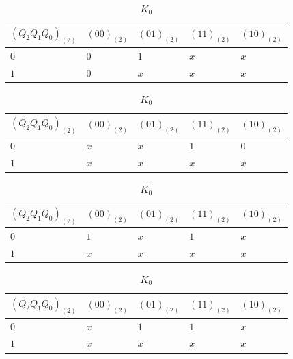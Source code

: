 \documentclass{ctexrep}
\begin{document}
\begin{enumerate}
\begin{table}[htbp]
			\vspace{2em}
			\begin{subtable}[htbp]{.45\linewidth}
				\centering
				\caption{$ J_1 $}
				\label{tab:J1}
				\begin{tabu}to
					$(Q_2Q_1Q_0)_{(2)}$& $(00)_{(2)}$ & $(01)_{(2)}$ & $(11)_{(2)}$ & $(10)_{(2)}$ \\
					\hline
					$0$ & $0$ & $1$ & $x$ & $x$ \\
					$1$ & $0$ & $x$ & $x$ & $x$ \\
				\end{tabu}
			\end{subtable}
			\quad
			\begin{subtable}[htbp]{.45\linewidth}
				\centering
				\caption{$ K_1 $}
				\label{tab:K1}
				\begin{tabu}to
					$(Q_2Q_1Q_0)_{(2)}$& $(00)_{(2)}$ & $(01)_{(2)}$ & $(11)_{(2)}$ & $(10)_{(2)}$ \\
					\hline
					$0$ & $x$ & $x$ & $1$ & $0$ \\
					$1$ & $x$ & $x$ & $x$ & $x$ \\
				\end{tabu}
			\end{subtable}

			\vspace{2em}
			\begin{subtable}[htbp]{.45\linewidth}
				\centering
				\caption{$ J_0 $}
				\label{tab:J0}
				\begin{tabu}to
					$(Q_2Q_1Q_0)_{(2)}$& $(00)_{(2)}$ & $(01)_{(2)}$ & $(11)_{(2)}$ & $(10)_{(2)}$ \\
					\hline
					$0$ & $1$ & $x$ & $1$ & $x$ \\
					$1$ & $x$ & $x$ & $x$ & $x$ \\
				\end{tabu}
			\end{subtable}
			\quad
			\begin{subtable}[htbp]{.45\linewidth}
				\centering
				\caption{$ K_0 $}
				\label{tab:K0}
				\begin{tabu}to
					$(Q_2Q_1Q_0)_{(2)}$& $(00)_{(2)}$ & $(01)_{(2)}$ & $(11)_{(2)}$ & $(10)_{(2)}$ \\
					\hline
					$0$ & $x$ & $1$ & $1$ & $x$ \\
					$1$ & $x$ & $x$ & $x$ & $x$ \\
				\end{tabu}
			\end{subtable}
		\end{table}


\end{enumerate}
\end{document}

